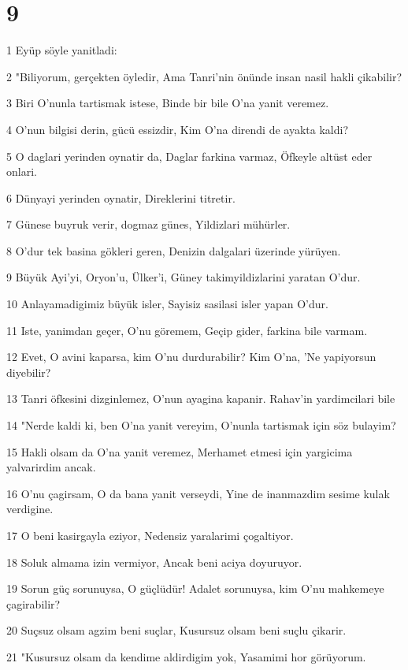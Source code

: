 \chapter{9}

\par 1 Eyüp söyle yanitladi:
\par 2 "Biliyorum, gerçekten öyledir, Ama Tanri'nin önünde insan nasil hakli çikabilir?
\par 3 Biri O'nunla tartismak istese, Binde bir bile O'na yanit veremez.
\par 4 O'nun bilgisi derin, gücü essizdir, Kim O'na direndi de ayakta kaldi?
\par 5 O daglari yerinden oynatir da, Daglar farkina varmaz, Öfkeyle altüst eder onlari.
\par 6 Dünyayi yerinden oynatir, Direklerini titretir.
\par 7 Günese buyruk verir, dogmaz günes, Yildizlari mühürler.
\par 8 O'dur tek basina gökleri geren, Denizin dalgalari üzerinde yürüyen.
\par 9 Büyük Ayi'yi, Oryon'u, Ülker'i, Güney takimyildizlarini yaratan O'dur.
\par 10 Anlayamadigimiz büyük isler, Sayisiz sasilasi isler yapan O'dur.
\par 11 Iste, yanimdan geçer, O'nu göremem, Geçip gider, farkina bile varmam.
\par 12 Evet, O avini kaparsa, kim O'nu durdurabilir? Kim O'na, 'Ne yapiyorsun diyebilir?
\par 13 Tanri öfkesini dizginlemez, O'nun ayagina kapanir. Rahav'in yardimcilari bile
\par 14 "Nerde kaldi ki, ben O'na yanit vereyim, O'nunla tartismak için söz bulayim?
\par 15 Hakli olsam da O'na yanit veremez, Merhamet etmesi için yargicima yalvarirdim ancak.
\par 16 O'nu çagirsam, O da bana yanit verseydi, Yine de inanmazdim sesime kulak verdigine.
\par 17 O beni kasirgayla eziyor, Nedensiz yaralarimi çogaltiyor.
\par 18 Soluk almama izin vermiyor, Ancak beni aciya doyuruyor.
\par 19 Sorun güç sorunuysa, O güçlüdür! Adalet sorunuysa, kim O'nu mahkemeye çagirabilir?
\par 20 Suçsuz olsam agzim beni suçlar, Kusursuz olsam beni suçlu çikarir.
\par 21 "Kusursuz olsam da kendime aldirdigim yok, Yasamimi hor görüyorum.
